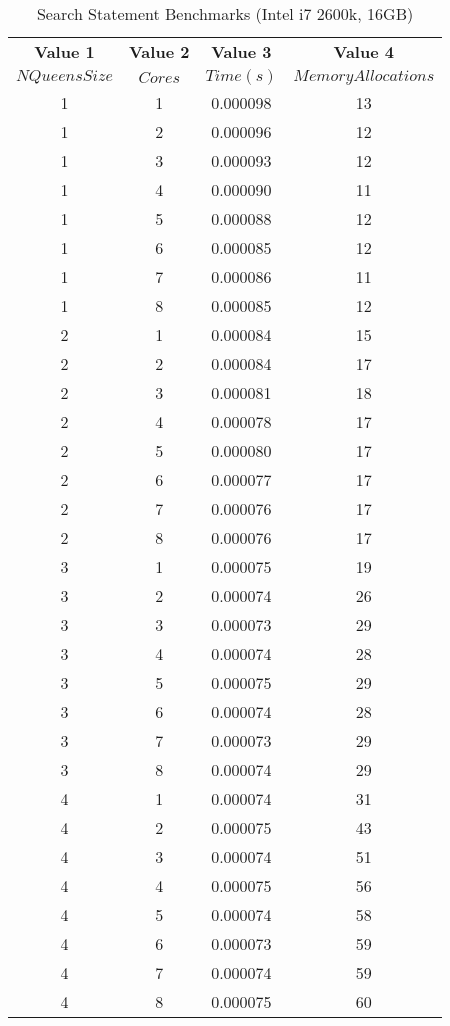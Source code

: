 \documentclass{article}
\begin{document}
\begin{table}[h!]
  \begin{center}
    \caption{Search Statement Benchmarks (Intel i7 2600k, 16GB)}
    \label{tab:table1}
    \begin{tabular}{c|c|c|c} %
      \textbf{Value 1} & \textbf{Value 2} & \textbf{Value 3} & \textbf{Value 4}\\
      $NQueens Size$ & $Cores$ & $Time(s)$ & $Memory Allocations$ \\
      \hline
1 & 1 & 0.000098 & 13\\
1 & 2 & 0.000096 & 12\\
1 & 3 & 0.000093 & 12\\
1 & 4 & 0.000090 & 11\\
1 & 5 & 0.000088 & 12\\
1 & 6 & 0.000085 & 12\\
1 & 7 & 0.000086 & 11\\
1 & 8 & 0.000085 & 12\\
2 & 1 & 0.000084 & 15\\
2 & 2 & 0.000084 & 17\\
2 & 3 & 0.000081 & 18\\
2 & 4 & 0.000078 & 17\\
2 & 5 & 0.000080 & 17\\
2 & 6 & 0.000077 & 17\\
2 & 7 & 0.000076 & 17\\
2 & 8 & 0.000076 & 17\\
3 & 1 & 0.000075 & 19\\
3 & 2 & 0.000074 & 26\\
3 & 3 & 0.000073 & 29\\
3 & 4 & 0.000074 & 28\\
3 & 5 & 0.000075 & 29\\
3 & 6 & 0.000074 & 28\\
3 & 7 & 0.000073 & 29\\
3 & 8 & 0.000074 & 29\\
4 & 1 & 0.000074 & 31\\
4 & 2 & 0.000075 & 43\\
4 & 3 & 0.000074 & 51\\
4 & 4 & 0.000075 & 56\\
4 & 5 & 0.000074 & 58\\
4 & 6 & 0.000073 & 59\\
4 & 7 & 0.000074 & 59\\
4 & 8 & 0.000075 & 60\\

\end{tabular}
\end{center}
\end{table}
\end{document}
